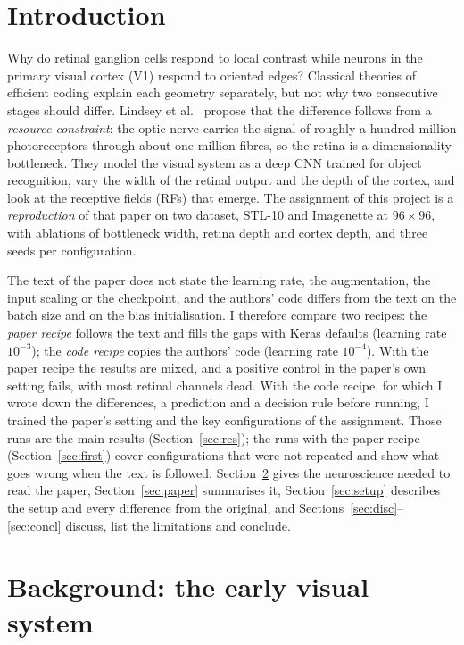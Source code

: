 \documentclass[11pt,a4paper]{article}
\begin{document}
\section{Introduction}
Why do retinal ganglion cells respond to local contrast while neurons in the primary visual cortex (V1) respond to oriented edges? Classical theories of efficient coding explain each geometry separately, but not why two consecutive stages should differ. Lindsey et al.\ \cite{lindsey2019} propose that the difference follows from a \emph{resource constraint}: the optic nerve carries the signal of roughly a hundred million photoreceptors through about one million fibres, so the retina is a dimensionality bottleneck. They model the visual system as a deep CNN trained for object recognition, vary the width of the retinal output and the depth of the cortex, and look at the receptive fields (RFs) that emerge. The assignment of this project is a \emph{reproduction} of that paper on two dataset, STL-10 and Imagenette at $96\times96$, with ablations of bottleneck width, retina depth and cortex depth, and three seeds per configuration.

The text of the paper does not state the learning rate, the augmentation, the input scaling or the checkpoint, and the authors' code differs from the text on the batch size and on the bias initialisation. I therefore compare two recipes: the \emph{paper recipe} follows the text and fills the gaps with Keras defaults (learning rate $10^{-3}$); the \emph{code recipe} copies the authors' code (learning rate $10^{-4}$). With the paper recipe the results are mixed, and a positive control in the paper's own setting fails, with most retinal channels dead. With the code recipe, for which I wrote down the differences, a prediction and a decision rule before running, I trained the paper's setting and the key configurations of the assignment. Those runs are the main results (Section~\ref{sec:res}); the runs with the paper recipe (Section~\ref{sec:first}) cover configurations that were not repeated and show what goes wrong when the text is followed. Section~\ref{sec:bg} gives the neuroscience needed to read the paper, Section~\ref{sec:paper} summarises it, Section~\ref{sec:setup} describes the setup and every difference from the original, and Sections~\ref{sec:disc}--\ref{sec:concl} discuss, list the limitations and conclude.

\section{Background: the early visual system}\label{sec:bg}
\end{document}
